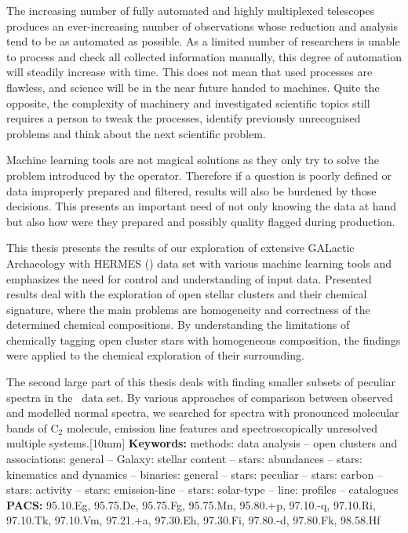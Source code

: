 The increasing number of fully automated and highly multiplexed telescopes produces an ever-increasing number of observations whose reduction and analysis tend to be as automated as possible. As a limited number of researchers is unable to process and check all collected information manually, this degree of automation will steadily increase with time. This does not mean that used processes are flawless, and science will be in the near future handed to machines. Quite the opposite, the complexity of machinery and investigated scientific topics still requires a person to tweak the processes, identify previously unrecognised problems and think about the next scientific problem.

Machine learning tools are not magical solutions as they only try to solve the problem introduced by the operator. Therefore if a question is poorly defined or data improperly prepared and filtered, results will also be burdened by those decisions. This presents an important need of not only knowing the data at hand but also how were they prepared and possibly quality flagged during production.

This thesis presents the results of our exploration of extensive GALactic Archaeology with HERMES (\Gh) data set with various machine learning tools and emphasizes the need for control and understanding of input data. Presented results deal with the exploration of open stellar clusters and their chemical signature, where the main problems are homogeneity and correctness of the determined chemical compositions. By understanding the limitations of chemically tagging open cluster stars with homogeneous composition, the findings were applied to the chemical exploration of their surrounding. 

The second large part of this thesis deals with finding smaller subsets of peculiar spectra in the \Gh\ data set. By various approaches of comparison between observed and modelled normal spectra, we searched for spectra with pronounced molecular bands of C$_2$ molecule, emission line features and spectroscopically unresolved multiple systems.[10mm]
{\bf Keywords:} methods: data analysis -- open clusters and associations: general -- Galaxy: stellar content -- stars: abundances -- stars: kinematics and dynamics -- binaries: general -- stars: peculiar -- stars: carbon -- stars: activity -- stars: emission-line -- stars: solar-type -- line: profiles -- catalogues\\[3mm]
{\bf PACS:} 95.10.Eg, 95.75.De, 95.75.Fg, 95.75.Mn, 95.80.+p, 97.10.-q, 97.10.Ri, 97.10.Tk, 97.10.Vm, 97.21.+a, 97.30.Eh, 97.30.Fi, 97.80.-d, 97.80.Fk, 98.58.Hf